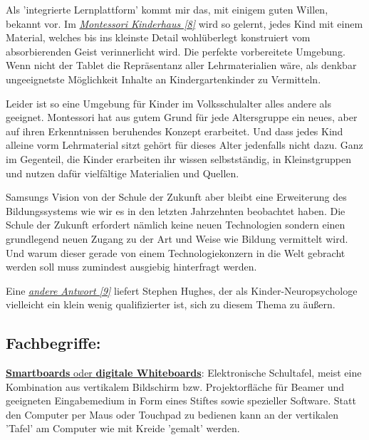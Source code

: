 \documentclass[10pt,a4paper,ngerman,twoside]{article} %
\begin{document}
\begin{multicols}{3}
Als 'integrierte Lernplattform' kommt mir das, mit einigem guten Willen, bekannt vor. Im \href{http://www.montessori-kindergarten.at/}{\textit{Montessori Kinderhaus [8]}} wird so gelernt, jedes Kind mit einem Material, welches bis ins kleinste Detail wohlüberlegt konstruiert vom absorbierenden Geist verinnerlicht wird. Die perfekte vorbereitete Umgebung. Wenn nicht der Tablet die Repräsentanz aller Lehrmaterialien wäre, als denkbar ungeeignetste Möglichkeit Inhalte an Kindergartenkinder zu Vermitteln.

Leider ist so eine Umgebung für Kinder im Volksschulalter alles andere als geeignet. Montessori hat aus gutem Grund für jede Altersgruppe ein neues, aber auf ihren Erkenntnissen beruhendes Konzept erarbeitet. Und dass jedes Kind alleine vorm Lehrmaterial sitzt gehört für dieses Alter jedenfalls nicht dazu. Ganz im Gegenteil, die Kinder erarbeiten ihr wissen selbstständig, in Kleinstgruppen und nutzen dafür vielfältige Materialien und Quellen.

Samsungs Vision von der Schule der Zukunft aber bleibt eine Erweiterung des Bildungssystems wie wir es in den letzten Jahrzehnten beobachtet haben. Die Schule der Zukunft erfordert nämlich keine neuen Technologien sondern einen grundlegend neuen Zugang zu der Art und Weise wie Bildung vermittelt wird. Und warum dieser gerade von einem Technologiekonzern in die Welt gebracht werden soll muss zumindest ausgiebig hinterfragt werden.

Eine \href{https://vimeo.com/40791188}{\textit{andere Antwort [9]}} 
liefert Stephen Hughes, der als Kinder-Neuropsychologe vielleicht ein klein wenig qualifizierter ist, sich zu diesem Thema zu äußern.
\subsection*{Fachbegriffe:}
\href{https://de.wikipedia.org/wiki/Smartboard#Digitale_Whiteboards}{\textbf{Smartboards} oder \textbf{digitale Whiteboards}}: Elektronische Schultafel, meist eine Kombination aus vertikalem Bildschirm bzw. Projektorfläche für Beamer und geeigneten Eingabemedium in Form eines Stiftes sowie spezieller Software. Statt den Computer per Maus oder Touchpad zu bedienen kann an der vertikalen 'Tafel' am Computer wie mit Kreide 'gemalt' werden.


\end{multicols}
\end{document}
